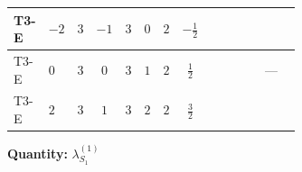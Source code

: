 \documentclass[8pt]{article}
\begin{document}
\begin{landscape}
\begin{longtable}{@{}llcccccc >{\raggedright\arraybackslash}p{0.21\linewidth} >{\raggedright\arraybackslash}p{0.21\linewidth} >{\raggedright\arraybackslash}p{0.21\linewidth}@{}}
\midrule
T3-E & $-2$ & $3$ & $-1$ & $3$ & $0$ & $2$ & $-\frac{1}{2}$ & \scriptsize\adjustbox{max width=\linewidth}{$\begin{gathered} +2 {\lambda_{S_1}^{(A)}} T_{\nu}^{(1)}\end{gathered}$} & \scriptsize\adjustbox{max width=\linewidth}{$\begin{gathered} +21 {g_2}^4\end{gathered}$} & \scriptsize\adjustbox{max width=\linewidth}{$\begin{gathered} +{g_1}^2 \left(12 {g_2}^2-12 {\lambda_{S_1}^{(1)}}-6 {\lambda_{S_1}^{(A)}}\right)\end{gathered}$} \\
\midrule
T3-E & $0$ & $3$ & $0$ & $3$ & $1$ & $2$ & $\frac{1}{2}$ & \scriptsize\adjustbox{max width=\linewidth}{$\begin{gathered} +2 {\lambda_{S_1}^{(A)}} T_{\nu}^{(1)}\end{gathered}$} & \scriptsize\adjustbox{max width=\linewidth}{$\begin{gathered} +21 {g_2}^4\end{gathered}$} & --- \\
\midrule
T3-E & $2$ & $3$ & $1$ & $3$ & $2$ & $2$ & $\frac{3}{2}$ & \scriptsize\adjustbox{max width=\linewidth}{$\begin{gathered} +2 {\lambda_{S_1}^{(A)}} T_{\nu}^{(1)}\end{gathered}$} & \scriptsize\adjustbox{max width=\linewidth}{$\begin{gathered} +21 {g_2}^4\end{gathered}$} & \scriptsize\adjustbox{max width=\linewidth}{$\begin{gathered} +{g_1}^2 \left(12 {g_2}^2-12 {\lambda_{S_1}^{(1)}}-6 {\lambda_{S_1}^{(A)}}\right)\end{gathered}$} \\
\midrule
\bottomrule
\end{longtable}
\clearpage
\noindent\textbf{Quantity: }$\lambda_{S_1}^{(1)}$\par\smallskip

\end{landscape}
\end{document}
